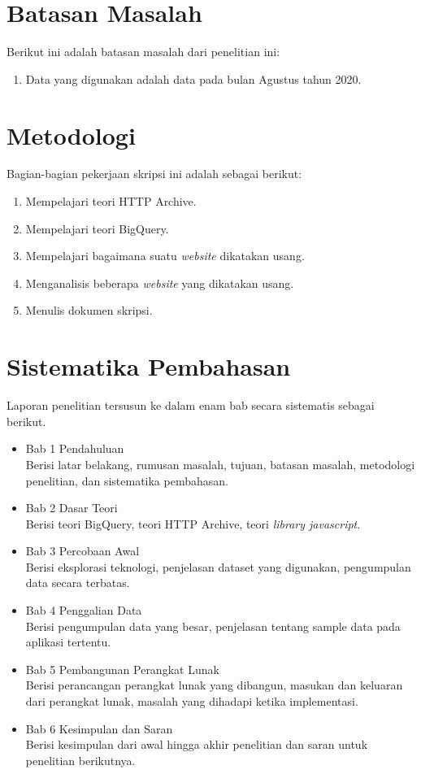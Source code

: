 \section{Batasan Masalah}
\label{sec:batasan}
Berikut ini adalah batasan masalah dari penelitian ini:
\begin{enumerate}
    \item Data yang digunakan adalah data pada bulan Agustus tahun 2020.

\end{enumerate}

\section{Metodologi}
\label{sec:metlit}
Bagian-bagian pekerjaan skripsi ini adalah sebagai berikut:
\begin{enumerate}
	\item Mempelajari teori HTTP Archive.
	\item Mempelajari teori BigQuery.
	\item Mempelajari bagaimana suatu \textit{website} dikatakan usang.
	\item Menganalisis beberapa \textit{website} yang dikatakan usang.
	\item Menulis dokumen skripsi.
\end{enumerate}


\section{Sistematika Pembahasan}
\label{sec:sispem}
Laporan penelitian tersusun ke dalam enam bab secara sistematis sebagai berikut.
\begin{itemize}
    \item Bab 1 Pendahuluan\\
    Berisi latar belakang, rumusan masalah, tujuan, batasan masalah, metodologi penelitian, dan sistematika pembahasan.
   
   \item Bab 2 Dasar Teori\\
    Berisi teori BigQuery, teori HTTP Archive, teori \textit{library javascript}.
   
    \item Bab 3 Percobaan Awal\\
    Berisi eksplorasi teknologi, penjelasan dataset yang digunakan, pengumpulan data secara terbatas.
  
    \item Bab 4 Penggalian Data\\
    Berisi pengumpulan data yang besar, penjelasan tentang sample data pada aplikasi tertentu.
    
    \item Bab 5 Pembangunan Perangkat Lunak\\
Berisi perancangan perangkat lunak yang dibangun, masukan dan keluaran dari perangkat lunak, masalah yang dihadapi ketika implementasi.
   
    \item Bab 6 Kesimpulan dan Saran\\
    Berisi kesimpulan dari awal hingga akhir penelitian dan saran untuk penelitian berikutnya.
    \end{itemize}
